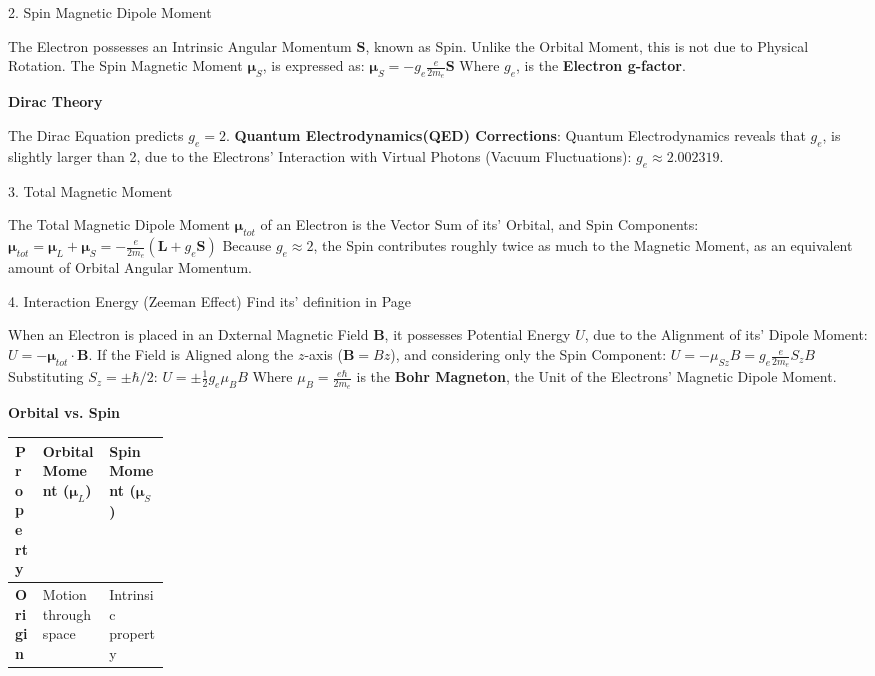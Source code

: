 \documentclass[a4paper, 10pt, onepage]{elegantbook}
\begin{document}
{    2. Spin Magnetic Dipole Moment  

The Electron possesses an Intrinsic Angular Momentum $\mathbf{S}$, known as Spin. Unlike the Orbital Moment, this is 
not due to Physical Rotation. The Spin Magnetic Moment $\boldsymbol{\mu}_S$, is expressed as:  
$ \boldsymbol{\mu}_S = -g_e \frac{e}{2m_e} \mathbf{S} $  
Where $g_e$, is the \textbf{Electron g-factor}.  

  \textbf{Dirac Theory}  

\noindent

 The Dirac Equation predicts $g_e = 2$.
  \textbf{Quantum Electrodynamics(QED) Corrections}: Quantum Electrodynamics reveals that $g_e$, is slightly larger 
than 2, due to the Electrons' Interaction with Virtual Photons (Vacuum Fluctuations): $ g_e \approx 2.002319 $.  

    3. Total Magnetic Moment  

The Total Magnetic Dipole Moment $\boldsymbol{\mu}_{tot}$ of an Electron is the Vector Sum of its' Orbital, and Spin 
Components:  
$ \boldsymbol{\mu}_{tot} = \boldsymbol{\mu}_L + \boldsymbol{\mu}_S = -\frac{e}{2m_e} ( \mathbf{L} + g_e \mathbf{S} ) $  
Because $g_e \approx 2$, the Spin contributes roughly twice as much to the Magnetic Moment, as an equivalent amount of 
Orbital Angular Momentum.  



    4. Interaction Energy (Zeeman Effect) Find its' definition in Page \pageref{sec:Definitions} 

When an Electron is placed in an Dxternal Magnetic Field $\mathbf{B}$, it possesses Potential Energy $U$, due to the 
Alignment of its' Dipole Moment:  
$ U = -\boldsymbol{\mu}_{tot} \cdot \mathbf{B} $.  
If the Field is Aligned along the $z$-axis ($\mathbf{B} = B\hat{z}$), and considering only the Spin Component:  
$ U = -\mu_{Sz} B = g_e \frac{e}{2m_e} S_z B $  
Substituting $S_z = \pm \hbar/2$: $ U = \pm \frac{1}{2} g_e \mu_B B $  
Where $\mu_B = \frac{e\hbar}{2m_e}$ is the \textbf{Bohr Magneton}, the Unit of the Electrons' Magnetic Dipole Moment.  

\newpage

   \textbf{Orbital vs. Spin}  

\begin{table}[ht]
\centering
\begin{tabularx}{\linewidth}{
  >{\raggedright\arraybackslash}p{0.18\linewidth}
  >{\raggedright\arraybackslash}X
  >{\raggedright\arraybackslash}X
}
\toprule
\textbf{Property}
& \textbf{Orbital Moment ($\boldsymbol{\mu}_L$)}
& \textbf{Spin Moment ($\boldsymbol{\mu}_S$)} \\
\midrule
\textbf{Origin}
& Motion through space
& Intrinsic property \\


\end{tabularx}
\end{table}}
\end{document}
